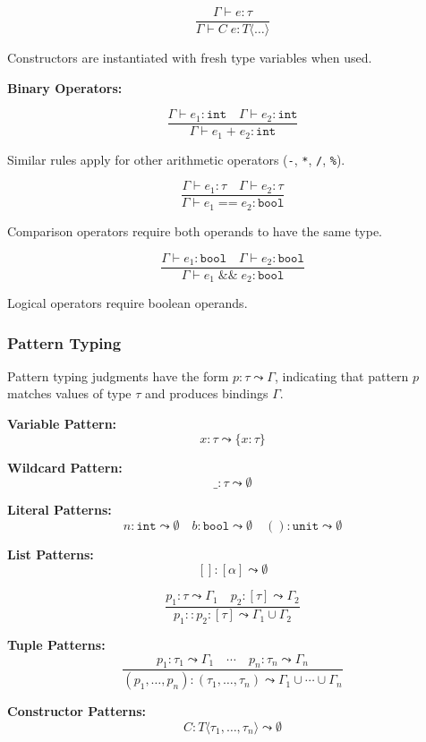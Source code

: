 \documentclass[conference,onecolumn]{IEEEtran}
\begin{document}
$$\frac{\Gamma \vdash e : \tau}{\Gamma \vdash C \; e : T\langle\ldots\rangle}$$

Constructors are instantiated with fresh type variables when used.

\textbf{Binary Operators:}

$$\frac{\Gamma \vdash e_1 : \texttt{int} \quad \Gamma \vdash e_2 : \texttt{int}}{\Gamma \vdash e_1 \; \texttt{+} \; e_2 : \texttt{int}}$$

Similar rules apply for other arithmetic operators (\texttt{-}, \texttt{*}, \texttt{/}, \texttt{\%}).

$$\frac{\Gamma \vdash e_1 : \tau \quad \Gamma \vdash e_2 : \tau}{\Gamma \vdash e_1 \; \texttt{==} \; e_2 : \texttt{bool}}$$

Comparison operators require both operands to have the same type.

$$\frac{\Gamma \vdash e_1 : \texttt{bool} \quad \Gamma \vdash e_2 : \texttt{bool}}{\Gamma \vdash e_1 \; \texttt{\&\&} \; e_2 : \texttt{bool}}$$

Logical operators require boolean operands.

\subsubsection{Pattern Typing}

Pattern typing judgments have the form $p : \tau \leadsto \Gamma$, indicating that pattern $p$ matches values of type $\tau$ and produces bindings $\Gamma$.

\textbf{Variable Pattern:}
$$x : \tau \leadsto \{x : \tau\}$$

\textbf{Wildcard Pattern:}
$$\_ : \tau \leadsto \emptyset$$

\textbf{Literal Patterns:}
$$n : \texttt{int} \leadsto \emptyset
\quad
b : \texttt{bool} \leadsto \emptyset
\quad
() : \texttt{unit} \leadsto \emptyset$$

\textbf{List Patterns:}
$$[] : [\alpha] \leadsto \emptyset$$

$$\frac{p_1 : \tau \leadsto \Gamma_1 \quad p_2 : [\tau] \leadsto \Gamma_2}{p_1 :: p_2 : [\tau] \leadsto \Gamma_1 \cup \Gamma_2}$$

\textbf{Tuple Patterns:}
$$\frac{p_1 : \tau_1 \leadsto \Gamma_1 \quad \cdots \quad p_n : \tau_n \leadsto \Gamma_n}{(p_1, \ldots, p_n) : (\tau_1, \ldots, \tau_n) \leadsto \Gamma_1 \cup \cdots \cup \Gamma_n}$$

\textbf{Constructor Patterns:}
$$C : T\langle\tau_1, \ldots, \tau_n\rangle \leadsto \emptyset$$
\end{document}
